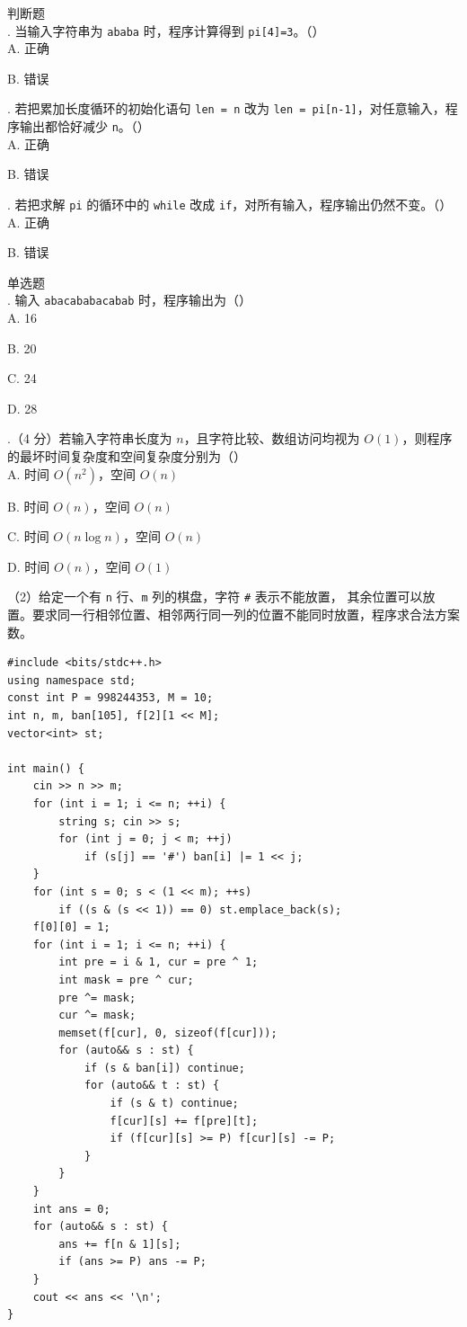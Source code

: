 \documentclass[a4paper]{ctexart}
\newcommand{\wdot}{{\fontsize{12}{12}\selectfont\textbullet}}
\newcommand{\q}[1]{\noindent #1}
\newcommand{\opt}[1]{\hspace*{2em} #1\par}
\begin{document}
\noindent\wdot\hspace{0.5em}判断题\\
\q{16.} 当输入字符串为 \texttt{ababa} 时，程序计算得到 \texttt{pi[4]=3}。（\qquad）\\
\opt{A. 正确}\opt{B. 错误}
\q{17.} 若把累加长度循环的初始化语句 \texttt{len = n} 改为 \texttt{len = pi[n-1]}，对任意输入，程序输出都恰好减少 \texttt{n}。（\qquad）\\
\opt{A. 正确}\opt{B. 错误}
\q{18.} 若把求解 \texttt{pi} 的循环中的 \texttt{while} 改成 \texttt{if}，对所有输入，程序输出仍然不变。（\qquad）\\
\opt{A. 正确}\opt{B. 错误}

\noindent\wdot\hspace{0.5em}单选题\\
\q{19.} 输入 \texttt{abacababacabab} 时，程序输出为（\qquad）\\
\opt{A. 16}\opt{B. 20}\opt{C. 24}\opt{D. 28}
\q{20.}（4 分）若输入字符串长度为 $n$，且字符比较、数组访问均视为 $O(1)$，则程序的最坏时间复杂度和空间复杂度分别为（\qquad）\\
\opt{A. 时间 $O(n^2)$，空间 $O(n)$}
\opt{B. 时间 $O(n)$，空间 $O(n)$}
\opt{C. 时间 $O(n\log n)$，空间 $O(n)$}
\opt{D. 时间 $O(n)$，空间 $O(1)$}

\noindent（2）给定一个有 \texttt{n} 行、\texttt{m} 列的棋盘，字符 \texttt{\#} 表示不能放置，
其余位置可以放置。要求同一行相邻位置、相邻两行同一列的位置不能同时放置，程序求合法方案数。
\begin{codebox}\begin{lstlisting}
#include <bits/stdc++.h>
using namespace std;
const int P = 998244353, M = 10;
int n, m, ban[105], f[2][1 << M];
vector<int> st;

int main() {
    cin >> n >> m;
    for (int i = 1; i <= n; ++i) {
        string s; cin >> s;
        for (int j = 0; j < m; ++j)
            if (s[j] == '#') ban[i] |= 1 << j;
    }
    for (int s = 0; s < (1 << m); ++s)
        if ((s & (s << 1)) == 0) st.emplace_back(s);
    f[0][0] = 1;
    for (int i = 1; i <= n; ++i) {
        int pre = i & 1, cur = pre ^ 1;
        int mask = pre ^ cur;
        pre ^= mask;
        cur ^= mask;
        memset(f[cur], 0, sizeof(f[cur]));
        for (auto&& s : st) {
            if (s & ban[i]) continue;
            for (auto&& t : st) {
                if (s & t) continue;
                f[cur][s] += f[pre][t];
                if (f[cur][s] >= P) f[cur][s] -= P;
            }
        }
    }
    int ans = 0;
    for (auto&& s : st) {
        ans += f[n & 1][s];
        if (ans >= P) ans -= P;
    }
    cout << ans << '\n';
}
\end{lstlisting}\end{codebox}
\end{document}
